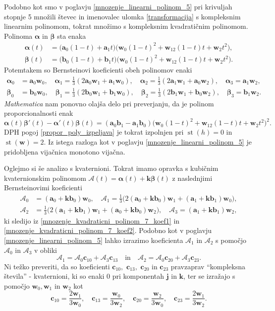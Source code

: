 \documentclass[12pt,a4paper,twoside]{article}
\theoremstyle{definition} %
\theoremstyle{plain} %
\theoremstyle{primerstyle}
\numberwithin{equation}{section}  %
\newcommand{\aV}{\mathbf{a}}
\newcommand{\bV}{\mathbf{b}}
\newcommand{\cV}{\mathbf{c}}
\newcommand{\jV}{\mathbf{j}}
\newcommand{\kV}{\mathbf{k}}
\newcommand{\wV}{\mathbf{w}}
\newcommand{\AQ}{\mathcal{A}}
\newcommand{\balpha}{\boldsymbol \alpha}
\newcommand{\bbeta}{\boldsymbol \beta}
\DeclareMathOperator{\st}{st}
\begin{document}
Podobno kot smo v poglavju \ref{mnozenje_linearni_polinom_5} pri krivuljah stopnje 5 množili števec in imenovalec ulomka \eqref{transformacija} s kompleksnim linearnim polinomom, tokrat množimo s kompleksnim kvadratičnim polinomom. Polinoma $\balpha$ in $\bbeta$ sta enaka
\begin{align}
	\balpha(t)&=\big(\aV_0(1-t)+\aV_1t\big)\big(\wV_0(1-t)^2+\wV_12(1-t)t+\wV_2t^2\big),\nonumber\\
	\bbeta(t)&=\big(\bV_0(1-t)+\bV_1t\big)\big(\wV_0(1-t)^2+\wV_12(1-t)t+\wV_2t^2\big).
\end{align}
Potemtakem so Bernsteinovi koeficienti obeh polinomov enaki
\begin{align}
	\balpha_0&=\aV_0\wV_0,\quad\balpha_1=\frac{1}{3}(2\aV_0\wV_1+\aV_1\wV_0),\quad\balpha_2=\frac{1}{3}(2\aV_1\wV_1+\aV_0\wV_2),\quad\balpha_3=\aV_1\wV_2,\label{mnozenje_kvadraticni_polinom_7_koef1}\\
	\bbeta_0&=\bV_0\wV_0,\quad\bbeta_1=\frac{1}{3}(2\bV_0\wV_1+\bV_1\wV_0),\quad\bbeta_2=\frac{1}{3}(2\bV_1\wV_1+\bV_0\wV_2),\quad\bbeta_3=\bV_1\wV_2.\label{mnozenje_kvadraticni_polinom_7_koef2}
\end{align}
\emph{Mathematica} nam ponovno olajša delo pri preverjanju, da je polinom proporcionalnosti enak
\begin{equation*}
	\balpha(t)\bbeta'(t)-\balpha'(t)\bbeta(t)=(\aV_0\bV_1-\aV_1\bV_0)\big(\wV_0(1-t)^2+\wV_12(1-t)t+\wV_2t^2\big)^2.
\end{equation*}
DPH pogoj \eqref{propor_poly_izpeljava} je tokrat izpolnjen pri $\st(h)=0$ in $\st(\wV)=2.$ Iz istega razloga kot v poglavju \ref{mnozenje_linearni_polinom_5} je pridobljena vijačnica monotono vijačna.

Oglejmo si še analizo s kvaternioni. Tokrat imamo opravka s kubičnim kvaternionskim polinomom $\AQ(t)=\balpha(t)+\kV\bbeta(t)$ z naslednjimi Bernsteinovimi koeficienti
\begin{align*}
	\AQ_0&=(\aV_0+\kV\bV_0)\wV_0,\quad\AQ_1=\frac{1}{3}\big(2(\aV_0+\kV\bV_0)\wV_1+(\aV_1+\kV\bV_1)\wV_0\big),\\
	\AQ_2&=\frac{1}{3}\big(2(\aV_1+\kV\bV_1)\wV_1+(\aV_0+\kV\bV_0)\wV_2\big),\quad\AQ_3=(\aV_1+\kV\bV_1)\wV_2,
\end{align*}
ki sledijo iz \eqref{mnozenje_kvadraticni_polinom_7_koef1} in \eqref{mnozenje_kvadraticni_polinom_7_koef2}. Podobno kot v poglavju \ref{mnozenje_linearni_polinom_5} lahko izrazimo koeficienta $\AQ_1$ in $\AQ_2$ s pomočjo $\AQ_0$ in $\AQ_3$ v obliki
\begin{equation}
	\AQ_1=\AQ_0\cV_{10}+\AQ_3\cV_{13}\quad\text{in}\quad\AQ_2=\AQ_0\cV_{20}+\AQ_3\cV_{23}.
\end{equation}
Ni težko preveriti, da so koeficienti $\cV_{10},$ $\cV_{13},$ $\cV_{20}$ in $\cV_{23}$ pravzaprav ``kompleksna števila'' - kvaternioni, ki so enaki 0 pri komponentah $\jV$ in $\kV$, ter se izražajo s pomočjo $\wV_0,\wV_1$ in $\wV_2$ kot
\begin{equation}
	\cV_{10}=\frac{2\wV_1}{3\wV_0},\quad\cV_{13}=\frac{\wV_0}{3\wV_2},\quad\cV_{20}=\frac{\wV_2}{3\wV_0},\quad\cV_{23}=\frac{2\wV_1}{3\wV_2}.
\end{equation}
\end{document}
